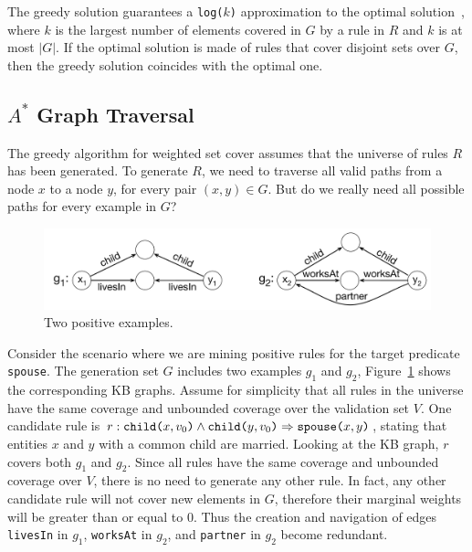 The greedy solution guarantees a \texttt{log($k$)} approximation
to the optimal solution~\cite{chvatal1979greedy}, where $k$ is the largest number of elements covered in $G$ by a rule in $R$ and $k$ is at most $|G|$. 
If the optimal solution is made of 
rules that cover disjoint sets over $G$, then the greedy solution coincides with the optimal one.

\vspace{-1ex}
\subsection{$A^*$ Graph Traversal}
\vspace{-1ex}
The greedy algorithm for weighted set cover assumes that the universe of rules $R$ has been generated.
To generate $R$, we need to traverse all valid paths from a node $x$ to a node $y$, for every pair $(x,y) \in G$. But do we really need all possible paths for every example in $G$?

	\begin{figure}%
		\centering
		\includegraphics[width=0.99\columnwidth]{include/figure/a*_graph_example.pdf}	
		\vspace{-5ex}
		\caption{Two positive examples.}
	\label{fig:positive_examples}
		\vspace{-0.5ex}
\end{figure}

\begin{example}
	Consider the scenario where we are mining positive rules for the target predicate \texttt{spouse}. The generation set $G$ includes two examples $g_1$ and $g_2$, Figure~\ref{fig:positive_examples} shows the corresponding KB graphs. %
	Assume for simplicity that all rules in the universe have the same coverage and unbounded coverage over the validation set $V$.
	One candidate rule is $r : \texttt{child(}x,v_0\texttt{)} \wedge \texttt{child(}y,v_0\texttt{)} \Rightarrow \texttt{spouse(}x,y\texttt{)}$, stating that entities $x$ and $y$ with a common child are married. Looking at the KB graph, $r$ covers both $g_1$ and $g_2$.
	Since all rules have the same coverage and unbounded coverage over $V$, 
	there is no need to generate any other rule. In fact, any other candidate rule will not cover new elements in $G$, therefore their marginal weights will be greater than or equal to $0$. 
	Thus the creation and navigation of edges \texttt{livesIn} in $g_1$, \texttt{worksAt} in $g_2$, and \texttt{partner} in $g_2$ become redundant.
\end{example}

